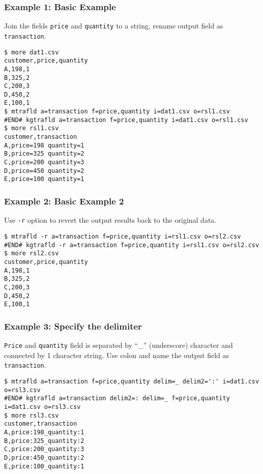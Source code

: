 \subsubsection*{Example 1: Basic Example}

Join the fields \verb|price| and \verb|quantity| to a string, rename output field as \verb|transaction|.



\begin{Verbatim}[baselinestretch=0.7,frame=single]
$ more dat1.csv
customer,price,quantity
A,198,1
B,325,2
C,200,3
D,450,2
E,100,1
$ mtrafld a=transaction f=price,quantity i=dat1.csv o=rsl1.csv
#END# kgtrafld a=transaction f=price,quantity i=dat1.csv o=rsl1.csv
$ more rsl1.csv
customer,transaction
A,price=198 quantity=1
B,price=325 quantity=2
C,price=200 quantity=3
D,price=450 quantity=2
E,price=100 quantity=1
\end{Verbatim}
\subsubsection*{Example 2: Basic Example 2}

Use \verb|-r| option to revert the output results back to the original data.


\begin{Verbatim}[baselinestretch=0.7,frame=single]
$ mtrafld -r a=transaction f=price,quantity i=rsl1.csv o=rsl2.csv
#END# kgtrafld -r a=transaction f=price,quantity i=rsl1.csv o=rsl2.csv
$ more rsl2.csv
customer,price,quantity
A,198,1
B,325,2
C,200,3
D,450,2
E,100,1
\end{Verbatim}
\subsubsection*{Example 3: Specify the delimiter}

\verb|Price| and \verb|quantity| field is separated by “\_” (underscore) character and connected by 1 character string. Use colon and name the output field as \verb|transaction|.


\begin{Verbatim}[baselinestretch=0.7,frame=single]
$ mtrafld a=transaction f=price,quantity delim=_ delim2=':' i=dat1.csv o=rsl3.csv
#END# kgtrafld a=transaction delim2=: delim=_ f=price,quantity i=dat1.csv o=rsl3.csv
$ more rsl3.csv
customer,transaction
A,price:198_quantity:1
B,price:325_quantity:2
C,price:200_quantity:3
D,price:450_quantity:2
E,price:100_quantity:1
\end{Verbatim}
